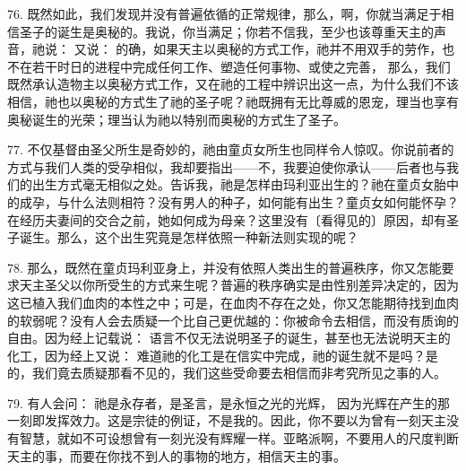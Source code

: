 76. 既然如此，我们发现并没有普遍依循的正常规律，那么，啊，你就当满足于相信圣子的诞生是奥秘的。我说，你当满足；你若不信我，至少也该尊重天主的声音，祂说： 又说： 的确，如果天主以奥秘的方式工作，祂并不用双手的劳作，也不在若干时日的进程中完成任何工作、塑造任何事物、或使之完善， 那么，我们既然承认造物主以奥秘方式工作，又在祂的工程中辨识出这一点，为什么我们不该相信，祂也以奥秘的方式生了祂的圣子呢？祂既拥有无比尊威的恩宠，理当也享有奥秘诞生的光荣；理当认为祂以特别而奥秘的方式生了圣子。\par

77. 不仅基督由圣父所生是奇妙的，祂由童贞女所生也同样令人惊叹。你说前者的方式与我们人类的受孕相似，我却要指出——不，我要迫使你承认——后者也与我们的出生方式毫无相似之处。告诉我，祂是怎样由玛利亚出生的？祂在童贞女胎中的成孕，与什么法则相符？没有男人的种子，如何能有出生？童贞女如何能怀孕？在经历夫妻间的交合之前，她如何成为母亲？这里没有〔看得见的〕原因，却有圣子诞生。那么，这个出生究竟是怎样依照一种新法则实现的呢？\par

78. 那么，既然在童贞玛利亚身上，并没有依照人类出生的普遍秩序，你又怎能要求天主圣父以你所受生的方式来生呢？普遍的秩序确实是由性别差异决定的，因为这已植入我们血肉的本性之中；可是，在血肉不存在之处，你又怎能期待找到血肉的软弱呢？没有人会去质疑一个比自己更优越的：你被命令去相信，而没有质询的自由。因为经上记载说： 语言不仅无法说明圣子的诞生，甚至也无法说明天主的化工，因为经上又说： 难道祂的化工是在信实中完成，祂的诞生就不是吗？是的，我们竟去质疑那看不见的，我们这些受命要去相信而非考究所见之事的人。\par

\par

79. 有人会问： 祂是永存者，是圣言，是永恒之光的光辉， 因为光辉在产生的那一刻即发挥效力。这是宗徒的例证，不是我的。因此，你不要以为曾有一刻天主没有智慧，就如不可设想曾有一刻光没有辉耀一样。亚略派啊，不要用人的尺度判断天主的事，而要在你找不到人的事物的地方，相信天主的事。\par

